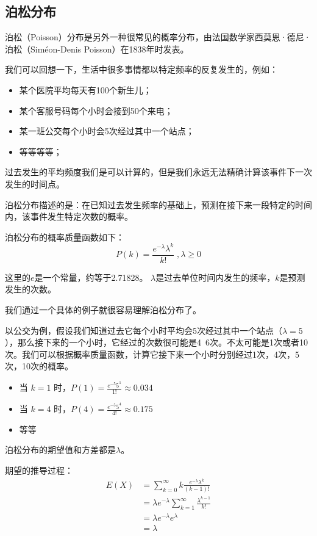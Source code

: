 \documentclass[12pt]{article}
\begin{document}
\subsection{泊松分布}
泊松（Poisson）分布是另外一种很常见的概率分布，由法国数学家西莫恩·德尼·泊松（Siméon-Denis Poisson）在1838年时发表。

我们可以回想一下，生活中很多事情都以特定频率的反复发生的，例如：
\begin{itemize}
    \item 某个医院平均每天有100个新生儿；
    \item 某个客服号码每个小时会接到50个来电；
    \item 某一班公交每个小时会5次经过其中一个站点；
    \item 等等等等；
\end{itemize}

过去发生的平均频度我们是可以计算的，但是我们永远无法精确计算该事件下一次发生的时间点。

泊松分布描述的是：在已知过去发生频率的基础上，预测在接下来一段特定的时间内，该事件发生特定次数的概率。

泊松分布的概率质量函数如下：
$$
P(k) = \frac{e^{-\lambda}\lambda^{k}}{k!} \; ,\lambda \ge 0
$$

这里的$e$是一个常量，约等于2.71828。
$\lambda$是过去单位时间内发生的频率，$k$是预测发生的次数。

我们通过一个具体的例子就很容易理解泊松分布了。

以公交为例，假设我们知道过去它每个小时平均会5次经过其中一个站点（$\lambda = 5$），那么接下来的一个小时，它经过的次数很可能是4~6次。不太可能是1次或者10次。我们可以根据概率质量函数，计算它接下来一个小时分别经过1次，4次，5次，10次的概率。

\begin{itemize}
\item 当 $k=1$ 时，$P(1) = \frac{e^{-5}5^1}{1!} \approx 0.034$
\item 当 $k=4$ 时，$P(4) = \frac{e^{-5}5^4}{4!} \approx 0.175$
\item 等等
\end{itemize}

泊松分布的期望值和方差都是$\lambda$。

期望的推导过程：
\begin{align*}
E(X) &= \sum_{k=0}^{\infty}k\frac{e^{-\lambda}\lambda^{k}}{(k-1)!} \\
&= \lambda e^{-\lambda}\sum_{k=1}^{\infty}\frac{\lambda^{k-1}}{k!} \\
&= \lambda e^{-\lambda}e^{\lambda} \\
&= \lambda
\end{align*}
\end{document}
